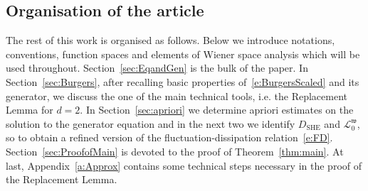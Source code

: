 \documentclass[reqno,11pt]{preprint}
\newcommand{\cL}{\mathcal{L}}
\newcommand{\cN}{\mathcal{N}}
\newcommand{\fw}{\mathfrak{w}}
\newcommand{\1}{\mathds{1}}
\newcommand{\SHE}{\mathrm{SHE}}
\newcommand{\gen}{\cL^\eps}
\newcommand{\gensy}{\cL_0}
\begin{document}
%

\subsection*{Organisation of the article}

The rest of this work is organised as follows. 
Below we introduce notations, conventions, function spaces and 
elements of Wiener space analysis which will be used throughout. 
Section~\ref{sec:EqandGen} is the bulk of the paper. In Section~\ref{sec:Burgers}, 
after recalling basic properties of~\eqref{e:BurgersScaled} 
and its generator, we discuss the one of the main technical tools, i.e. the 
Replacement Lemma for $d=2$. In Section~\ref{sec:apriori} we determine apriori estimates on the solution to the 
generator equation and in the next two we identify $D_\SHE$ and $\gensy^\fw$, 
so to obtain a refined version of the fluctuation-dissipation relation~\eqref{e:FD}. 
Section~\ref{sec:ProofofMain} is devoted to the proof of Theorem~\ref{thm:main}. 
At last, Appendix~\ref{a:Approx} contains some technical steps necessary in the proof of the 
Replacement Lemma. 
\end{document}
